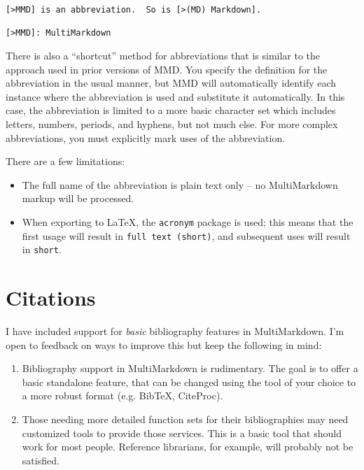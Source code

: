\begin{verbatim}
[>MMD] is an abbreviation.  So is [>(MD) Markdown].

[>MMD]: MultiMarkdown
\end{verbatim}

There is also a ``shortcut'' method for abbreviations that is similar to the approach used in prior versions of \gls{MMD}. You specify the definition for the abbreviation in the usual manner, but \gls{MMD} will automatically identify each instance where the abbreviation is used and substitute it automatically. In this case, the abbreviation is limited to a more basic character set which includes letters, numbers, periods, and hyphens, but not much else. For more complex abbreviations, you must explicitly mark uses of the abbreviation.

There are a few limitations:

\begin{itemize}
\item The full name of the abbreviation is plain text only -- no MultiMarkdown markup will be processed.

\item When exporting to LaTeX, the \texttt{acronym} package is used; this means that the first usage will result in \texttt{full text (short)}, and subsequent uses will result in \texttt{short}.

\end{itemize}

\section{Citations}
\label{citations}

I have included support for \emph{basic} bibliography features in MultiMarkdown. I'm open to feedback on ways to improve this but keep the following in mind:

\begin{enumerate}
\item Bibliography support in MultiMarkdown is rudimentary. The goal is to offer a basic standalone feature, that can be changed using the tool of your choice to a more robust format (e.g. BibTeX, CiteProc).

\item Those needing more detailed function sets for their bibliographies may need customized tools to provide those services. This is a basic tool that should work for most people. Reference librarians, for example, will probably not be satisfied.

\end{enumerate}


